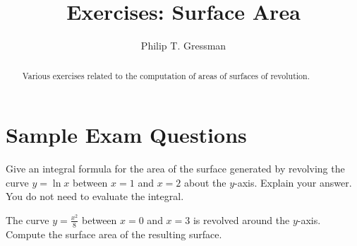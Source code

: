 \documentclass{ximera}
\title{Exercises: Surface Area}
\author{Philip T. Gressman}
\begin{document}
\begin{abstract}
Various exercises related to the computation of areas of surfaces of revolution.
\end{abstract}
\maketitle


\section*{Sample Exam Questions}

\begin{question}
Give an integral formula for the area of the surface generated by revolving the curve $y = \ln x$ between $x=1$ and $x=2$ about the $y$-axis. Explain your answer. You do not need to evaluate the integral. 
\begin{multipleChoice}
\end{multipleChoice}
\end{question}

\begin{question}
 The curve $y = \frac{x^2}{8}$ between $x=0$ and $x = 3$ is revolved around the $y$-axis. Compute the surface area of the resulting surface.
\begin{multipleChoice}
\end{multipleChoice}
\end{question}
\end{document}
